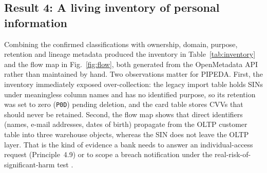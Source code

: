 \documentclass[journal,onecolumn,11pt]{IEEEtran}
\begin{document}
\subsection{Result 4: A living inventory of personal information}
Combining the confirmed classifications with ownership, domain, purpose, retention and lineage metadata produced the inventory in Table~\ref{tab:inventory} and the flow map in Fig.~\ref{fig:flow}, both generated from the OpenMetadata API rather than maintained by hand. Two observations matter for PIPEDA. First, the inventory immediately exposed over-collection: the legacy import table holds SINs under meaningless column names and has no identified purpose, so its retention was set to zero (\texttt{P0D}) pending deletion, and the card table stores CVVs that should never be retained. Second, the flow map shows that direct identifiers (names, e-mail addresses, dates of birth) propagate from the OLTP customer table into three warehouse objects, whereas the SIN does not leave the OLTP layer. That is the kind of evidence a bank needs to answer an individual-access request (Principle~4.9) or to scope a breach notification under the real-risk-of-significant-harm test \cite{breachregs}.
\end{document}
